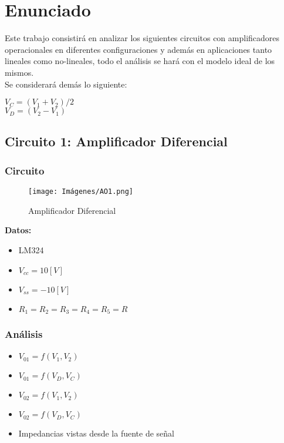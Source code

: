 \section{Enunciado}

Este trabajo consistirá en analizar los siguientes circuitos con amplificadores operacionales en diferentes configuraciones y además en aplicaciones tanto lineales como no-lineales, todo el análisis se hará con el modelo ideal de los mismos.\\
Se considerará demás lo siguiente:\\
\begin{center}
    $V_C = (V_1 + V_2)/2$\\
$V_D = (V_2 - V_1)$\\
\end{center}

\subsection{Circuito 1: Amplificador Diferencial}
    \subsubsection{Circuito}
        \begin{figure}[ht]
    	\centering
    	\texttt{[image: Imágenes/AO1.png]}
    	\caption{Amplificador Diferencial}
        \end{figure}
    	\begin{center}
            \textbf{Datos:}
        \end{center}
        \begin{itemize}
            \item LM324
            \item $V_{cc}= 10 [V]$
            \item $V_{ss}= -10 [V]$
            \item $R_1 = R_2 = R_3 = R_4 = R_5 = R$
        \end{itemize}
     
     \subsubsection{Análisis}
        \begin{itemize}
            \item $V_{01} = f(V_1, V_2)$
            \item $V_{01} = f(V_D, V_C)$
            \item $V_{02} = f(V_1, V_2)$
            \item $V_{02} = f(V_D, V_C)$
            \item Impedancias vistas desde la fuente de señal
        \end{itemize}

